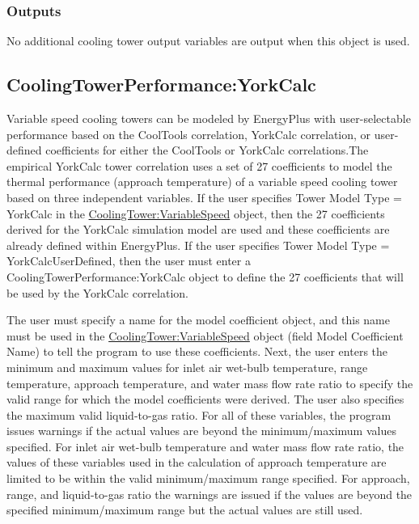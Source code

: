 \subsubsection{Outputs}\label{outputs-4-001}

No additional cooling tower output variables are output when this object is used.

\subsection{CoolingTowerPerformance:YorkCalc}\label{coolingtowerperformanceyorkcalc}

Variable speed cooling towers can be modeled by EnergyPlus with user-selectable performance based on the CoolTools correlation, YorkCalc correlation, or user-defined coefficients for either the CoolTools or YorkCalc correlations.The empirical YorkCalc tower correlation uses a set of 27 coefficients to model the thermal performance (approach temperature) of a variable speed cooling tower based on three independent variables. If the user specifies Tower Model Type = YorkCalc in the \hyperref[coolingtowervariablespeed]{CoolingTower:VariableSpeed} object, then the 27 coefficients derived for the YorkCalc simulation model are used and these coefficients are already defined within EnergyPlus. If the user specifies Tower Model Type = YorkCalcUserDefined, then the user must enter a CoolingTowerPerformance:YorkCalc object to define the 27 coefficients that will be used by the YorkCalc correlation.

The user must specify a name for the model coefficient object, and this name must be used in the \hyperref[coolingtowervariablespeed]{CoolingTower:VariableSpeed} object (field Model Coefficient Name) to tell the program to use these coefficients. Next, the user enters the minimum and maximum values for inlet air wet-bulb temperature, range temperature, approach temperature, and water mass flow rate ratio to specify the valid range for which the model coefficients were derived. The user also specifies the maximum valid liquid-to-gas ratio. For all of these variables, the program issues warnings if the actual values are beyond the minimum/maximum values specified. For inlet air wet-bulb temperature and water mass flow rate ratio, the values of these variables used in the calculation of approach temperature are limited to be within the valid minimum/maximum range specified. For approach, range, and liquid-to-gas ratio the warnings are issued if the values are beyond the specified minimum/maximum range but the actual values are still used.

